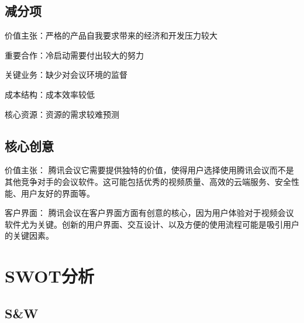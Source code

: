 \documentclass[a4paper,12pt]{article}
\begin{document}
    \subsection{减分项}
    价值主张：严格的产品⾃我要求带来的经济和开发压⼒较⼤
    
    重要合作：冷启动需要付出较⼤的努⼒
    
    关键业务：缺少对会议环境的监督
    
    成本结构：成本效率较低
    
    核⼼资源：资源的需求较难预测

    \subsection{核心创意}

    价值主张： 腾讯会议它需要提供独特的价值，使得用户选择使用腾讯会议而不是其他竞争对手的会议软件。这可能包括优秀的视频质量、高效的云端服务、安全性能、用户友好的界面等。
    
    客户界面： 腾讯会议在客户界面方面有创意的核心，因为用户体验对于视频会议软件尤为关键。创新的用户界面、交互设计、以及方便的使用流程可能是吸引用户的关键因素。
    

    \section{SWOT分析}
    \subsection{S\&W}
\end{document}
